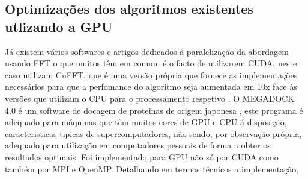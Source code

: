 \subsection{Optimizações dos algoritmos existentes utlizando a GPU}
\label{gpus1}
Já existem vários softwares e artigos dedicados à paralelização da abordagem usando FFT \cite{ritchiew.venkatramanvishwesh2010} o que muitos têm em comum é o facto de utilizarem CUDA, neste caso utilizam CuFFT, que é uma versão própria que fornece as implementações necessários para que a perfomance do algoritmo seja aumentada em 10x face às versões que utilizam o CPU para o processamento respetivo\cite{nvidiaFFT} . O MEGADOCK 4.0 é um software de docagem de proteinas de origem japonesa \cite{megadock40}, este programa é adequado para máquinas que têm muitos cores de GPU e CPU á disposição, caracteristicas tipicas de supercomputadores, não sendo, por observação própria, adequado para utilização em computadores pessoais de forma a obter os resultados optimais. Foi implementado para GPU não só por CUDA como também por MPI e OpenMP. Detalhando em termos técnicos a implementação, 
%
%
